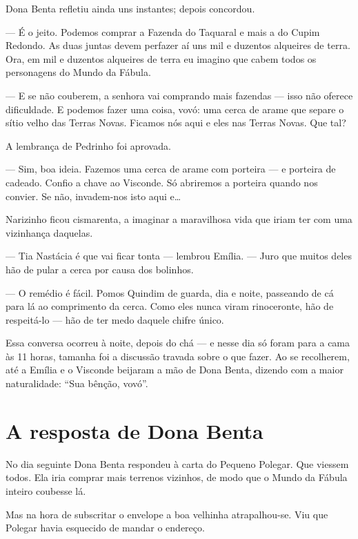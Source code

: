 Dona Benta refletiu ainda uns instantes; depois concordou.

--- É o jeito. Podemos comprar a Fazenda do Taquaral e mais a do Cupim
Redondo. As duas juntas devem perfazer aí uns mil e duzentos alqueires
de terra. Ora, em mil e duzentos alqueires de terra eu imagino que cabem
todos os personagens do Mundo da Fábula.

--- E se não couberem, a senhora vai comprando mais fazendas --- isso
não oferece dificuldade. E podemos fazer uma coisa, vovó: uma cerca de
arame que separe o sítio velho das Terras Novas. Ficamos nós aqui e eles
nas Terras Novas. Que tal?

A lembrança de Pedrinho foi aprovada.

--- Sim, boa ideia. Fazemos uma cerca de arame com porteira --- e
porteira de cadeado. Confio a chave ao Visconde. Só abriremos a porteira
quando nos convier. Se não, invadem-nos isto aqui e\ldots{}

Narizinho ficou cismarenta, a imaginar a maravilhosa vida que iriam ter
com uma vizinhança daquelas.

--- Tia Nastácia é que vai ficar tonta --- lembrou Emília. --- Juro que
muitos deles hão de pular a cerca por causa dos bolinhos.

--- O remédio é fácil. Pomos Quindim de guarda, dia e noite, passeando
de cá para lá ao comprimento da cerca. Como eles nunca viram
rinoceronte, hão de respeitá-lo --- hão de ter medo daquele chifre
único.

Essa conversa ocorreu à noite, depois do chá --- e nesse dia só foram
para a cama às 11 horas, tamanha foi a discussão travada sobre o que
fazer. Ao se recolherem, até a Emília e o Visconde beijaram a mão de
Dona Benta, dizendo com a maior naturalidade: ``Sua bênção, vovó''.


\chapter{A resposta de Dona Benta}

No dia seguinte Dona Benta respondeu à carta do Pequeno Polegar. Que
viessem todos. Ela iria comprar mais terrenos vizinhos, de modo que o
Mundo da Fábula inteiro coubesse lá.

Mas na hora de subscritar o envelope a boa velhinha atrapalhou-se. Viu
que Polegar havia esquecido de mandar o endereço.


